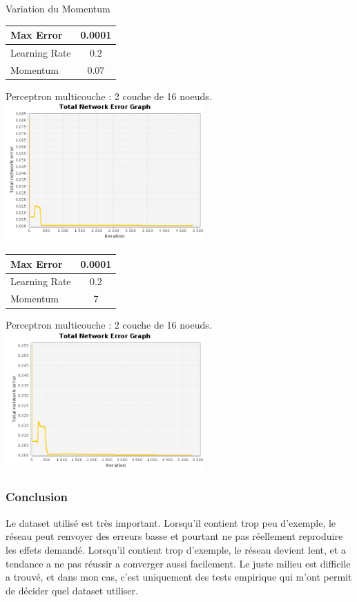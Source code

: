 \documentclass[10pt]{report}
\begin{document}
\begin{center}
Variation du Momentum\\
\begin{tabular}{|l|c|}
	\hline
	Max Error & 0.0001 \\
	\hline
	Learning Rate & 0.2 \\
	\hline
	Momentum & 0.07 \\
	\hline
\end{tabular}

Perceptron multicouche : 2 couche de 16 noeuds.\\
\includegraphics[height=200px]{img/SQUARE_16_16_101_m007.png}\\

\begin{tabular}{|l|c|}
	\hline
	Max Error & 0.0001 \\
	\hline
	Learning Rate & 0.2 \\
	\hline
	Momentum & 7 \\
	\hline
\end{tabular}

Perceptron multicouche : 2 couche de 16 noeuds.\\
\includegraphics[height=200px]{img/SQUARE_16_16_101_m7.png}\\
\end{center}

\subsubsection{Conclusion}
Le dataset utilisé est très important. Lorsqu'il contient trop peu d'exemple, le réseau peut renvoyer des erreurs basse et pourtant ne pas réellement reproduire les effets demandé. Lorsqu'il contient trop d'exemple, le réseau devient lent, et a tendance a ne pas réussir a converger aussi facilement. Le juste milieu est difficile a trouvé, et dans mon cas, c'est uniquement des tests empirique qui m'ont permit de décider quel dataset utiliser.\\
\end{document}
